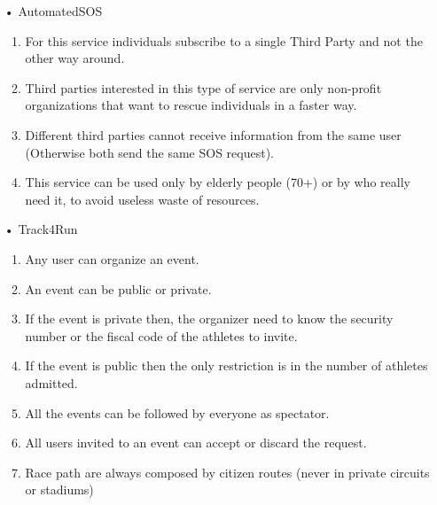 \begin{enumerate}
\item[•] {\Large AutomatedSOS}
	\begin{enumerate}
	\item For this service individuals subscribe to a single Third Party and not the other way around.
    \item Third parties interested in this type of service are only non-profit organizations that want to rescue individuals in a faster way.
    \item Different third parties cannot receive information from the same user (Otherwise both send the same SOS request).
    \item This service can be used only by elderly people (70+) or by who really need it, to avoid useless waste of resources. 
	\end{enumerate}
	
\item[•] {\Large Track4Run}
	\begin{enumerate}
	\item Any user can organize an event.
    \item An event can be public or private.
    \item If the event is private then, the organizer need to know the security number or the fiscal code of the athletes to invite.
    \item If the event is public then the only restriction is in the number of athletes admitted.
    \item All the events can be followed by everyone as spectator.
    \item All users invited to an event can accept or discard the request.
    \item Race path are always composed by citizen routes (never in private circuits or stadiums)
    \end{enumerate}
\end{enumerate}

